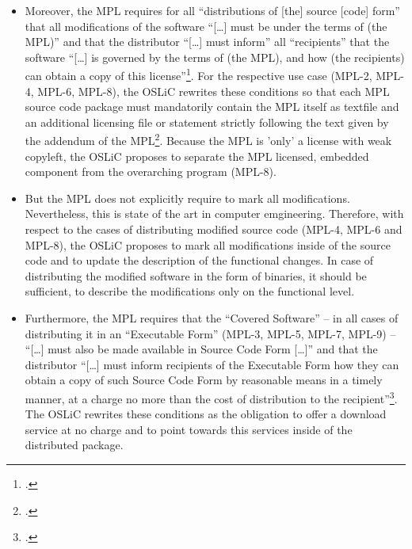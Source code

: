 \begin{itemize}
  \item Moreover, the MPL requires for all \enquote{distributions of [the]
  source [code] form} that all modifications of the software \enquote{[\ldots]
  must be under the terms of (the MPL)} and that the distributor
  \enquote{[\ldots] must inform} all \enquote{recipients} that the software
  \enquote{[\ldots] is governed by the terms of (the MPL), and how (the
  recipients) can obtain a copy of this license}\footcite[cf.][\nopage wp.\
  §3.1]{Mpl20OsiLicense2013a}. For the respective use case (MPL-2, MPL-4, MPL-6,
  MPL-8), the OSLiC rewrites these conditions so that each MPL source code
  package must mandatorily contain the MPL itself as textfile and an additional
  licensing file or statement strictly following the text given by the addendum
  of the MPL\footcite[cf.][\nopage wp.\ Exhibit A]{Mpl20OsiLicense2013a}. Because
  the MPL is 'only' a license with weak copyleft, the OSLiC proposes to separate
  the MPL licensed, embedded component from the overarching program (MPL-8).
  
  \item But the MPL does not explicitly require to mark all modifications.
  Nevertheless, this is state of the art in computer emgineering. Therefore,
  with respect to the cases of distributing modified source code (MPL-4, MPL-6
  and MPL-8), the OSLiC proposes to mark all modifications inside of the source
  code and to update the description of the functional changes. In case of
  distributing the modified software in the form of binaries, it should be
  sufficient, to describe the modifications only on the functional level.
  
  \item Furthermore, the MPL requires that the \enquote{Covered Software} -- in
  all cases of distributing it in an \enquote{Executable Form} (MPL-3, MPL-5,
  MPL-7, MPL-9) -- \enquote{[\ldots] must also be made available in Source Code
  Form [\ldots]} and that the distributor \enquote{[\ldots] must inform
  recipients of the Executable Form how they can obtain a copy of such Source
  Code Form by reasonable means in a timely manner, at a charge no more than the
  cost of distribution to the recipient}\footcite[cf.][\nopage wp.\
  §3.2.a]{Mpl20OsiLicense2013a}. The OSLiC rewrites these conditions as the
  obligation to offer a download service at no charge and to point towards this
  services inside of the distributed package.
  

\end{itemize}
